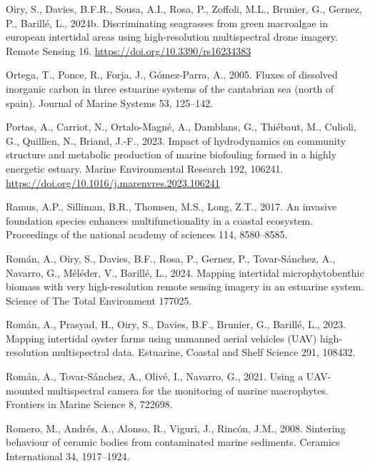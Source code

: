 \documentclass[
  letterpaper,
  DIV=11,
  numbers=noendperiod]{scrartcl}
\newlength{\cslhangindent}
\newenvironment{CSLReferences}[2] %
 {\begin{list}{}{%
  \setlength{\itemindent}{0pt}
  \setlength{\leftmargin}{0pt}
  \setlength{\parsep}{0pt}
  \ifodd #1
   \setlength{\leftmargin}{\cslhangindent}
   \setlength{\itemindent}{-1\cslhangindent}
  \fi
  \setlength{\itemsep}{#2\baselineskip}}}
 {\end{list}}
\begin{document}
\begin{CSLReferences}{1}{0}
Oiry, S., Davies, B.F.R., Sousa, A.I., Rosa, P., Zoffoli, M.L., Brunier,
G., Gernez, P., Barillé, L., 2024b. Discriminating seagrasses from green
macroalgae in european intertidal areas using high-resolution
multispectral drone imagery. Remote Sensing 16.
\url{https://doi.org/10.3390/rs16234383}

Ortega, T., Ponce, R., Forja, J., Gómez-Parra, A., 2005. Fluxes of
dissolved inorganic carbon in three estuarine systems of the cantabrian
sea (north of spain). Journal of Marine Systems 53, 125--142.

Portas, A., Carriot, N., Ortalo-Magné, A., Damblans, G., Thiébaut, M.,
Culioli, G., Quillien, N., Briand, J.-F., 2023. Impact of hydrodynamics
on community structure and metabolic production of marine biofouling
formed in a highly energetic estuary. Marine Environmental Research 192,
106241. \url{https://doi.org/10.1016/j.marenvres.2023.106241}

Ramus, A.P., Silliman, B.R., Thomsen, M.S., Long, Z.T., 2017. An
invasive foundation species enhances multifunctionality in a coastal
ecosystem. Proceedings of the national academy of sciences 114,
8580--8585.

Román, A., Oiry, S., Davies, B.F., Rosa, P., Gernez, P., Tovar-Sánchez,
A., Navarro, G., Méléder, V., Barillé, L., 2024. Mapping intertidal
microphytobenthic biomass with very high-resolution remote sensing
imagery in an estuarine system. Science of The Total Environment 177025.

Román, A., Prasyad, H., Oiry, S., Davies, B.F., Brunier, G., Barillé,
L., 2023. Mapping intertidal oyster farms using unmanned aerial vehicles
(UAV) high-resolution multispectral data. Estuarine, Coastal and Shelf
Science 291, 108432.

Román, A., Tovar-Sánchez, A., Olivé, I., Navarro, G., 2021. Using a
UAV-mounted multispectral camera for the monitoring of marine
macrophytes. Frontiers in Marine Science 8, 722698.

Romero, M., Andrés, A., Alonso, R., Viguri, J., Rincón, J.M., 2008.
Sintering behaviour of ceramic bodies from contaminated marine
sediments. Ceramics International 34, 1917--1924.


\end{CSLReferences}
\end{document}
